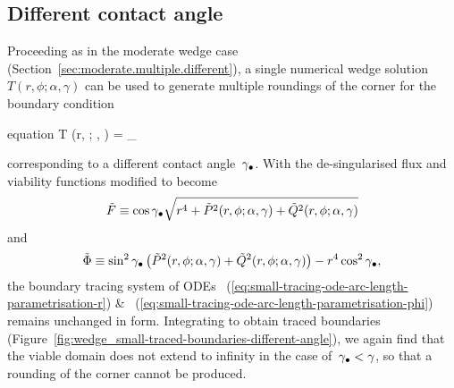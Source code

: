 \subsection{Different contact angle}
\label{sec:small.rounding.different}

Proceeding as in the moderate wedge case
(Section~\ref{sec:moderate.multiple.different}),
a single numerical wedge solution~$T (r, \phi; \alpha, \gamma)$
can be used to generate multiple roundings of the corner
for the boundary condition
\begin{important}{equation}
  \normalvec \dotp \del T (r, \phi; \alpha, \gamma) =
    \cos\gamma_\tr
  \label{eq:small-flux-boundary-condition-different-angle}
\end{important}
corresponding to a different contact angle~$\gamma_\bullet$.
With the de-singularised flux and viability functions
modified to become
\begin{equation}
  \tilde{F} \equiv
    \cos\gamma_\bullet
    \sqrt{
      r^4
      + \tilde{P}^2 (r, \phi; \alpha, \gamma)
      + \tilde{Q}^2 (r, \phi; \alpha, \gamma)
    }
  \label{eq:small-flux-function-de-singularised-different-angle}
\end{equation}
and
\begin{equation}
  \desing{\Phi} \ideq
    \sin^2\gamma_\tr \,
    \roundbr*{
      \desing{P}^2 (r, \phi; \alpha, \gamma)
        +
      \desing{Q}^2 (r, \phi; \alpha, \gamma)
    }
      - r^4 \cos^2\gamma_\tr,
  \label{eq:small-viability-function-de-singularised-different-angle}
\end{equation}
the boundary tracing system of ODEs~%
  (\ref{eq:small-tracing-ode-arc-length-parametrisation-r})
\&~%
  (\ref{eq:small-tracing-ode-arc-length-parametrisation-phi})
remains unchanged in form.
Integrating to obtain traced boundaries
(Figure~\ref{fig:wedge_small-traced-boundaries-different-angle}),
we again find that the viable domain does not extend to infinity
in the case of~$\gamma_\bullet < \gamma$,
so that a rounding of the corner cannot be produced.

